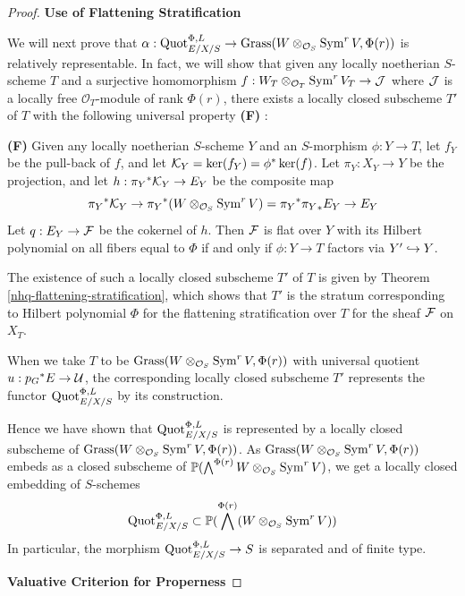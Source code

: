 \begin{proof}
\bigskip

\centerline{\large\bf Use of Flattening Stratification}
\nopagebreak
\medskip
\nopagebreak
We will next prove that
$\alpha :\operatorname{Quot}^{\Phi,L}_{E/X/S} \to
\operatorname{Grass}( W \otimes_{{\mathcal O}_S}\operatorname{Sym}^r V, \Phi(r))$
is relatively representable. In fact, we will show that
given any locally noetherian $S$-scheme $T$ and
a surjective homomorphism $f :  W_T \otimes_{{\mathcal O}_T}\operatorname{Sym}^r V_T \to \mathcal{J}$
where $\mathcal{J}$ is a locally free ${\mathcal O}_T$-module of rank $\Phi(r)$,
there exists a locally closed subscheme $T'$ of
$T$ with the following universal property \textbf{(F)} :

\textbf{(F) } Given any
locally noetherian $S$-scheme $Y$ and an $S$-morphism $\phi :Y\to T$,
let $f_Y$ be the pull-back of $f$, and
let $\mathcal{K}_Y = \operatorname{ker}(f_Y) = \phi^* \operatorname{ker}(f)$. Let
$\pi_Y : X_Y \to Y$ be the projection, and let
$h : {\pi_Y}^* \mathcal{K}_Y \to E_Y$ be the composite map
$${\pi_Y}^* \mathcal{K}_Y \to  {\pi_Y}^* (W \otimes_{{\mathcal O}_S}\operatorname{Sym}^r V)
= {\pi_Y}^*{\pi_Y}_*E_Y \to  E_Y$$
Let $q:   E_Y \to \mathcal{F}$ be the cokernel of $h$.
Then $\mathcal{F}$ is flat over $Y$ with its Hilbert polynomial on all fibers
equal to $\Phi$ if and only if $\phi :Y\to T$
factors via $Y'\hookrightarrow Y$.

The existence of such a locally closed subscheme $T'$ of
$T$ is given by Theorem \ref{nhq-flattening-stratification}, which
shows that $T'$ is the stratum corresponding to
Hilbert polynomial $\Phi$ for the
flattening stratification over $T$ for the sheaf $\mathcal{F}$ on $X_T$.

When we take $T$ to be $\operatorname{Grass}( W \otimes_{{\mathcal O}_S}\operatorname{Sym}^r V, \Phi(r))$
with universal quotient $u : {p_G}^*E \to \mathcal{U}$, the corresponding
locally closed subscheme $T'$ represents
the functor $\operatorname{Quot}^{\Phi,L}_{E/X/S}$ by its construction.

Hence we have shown that $\operatorname{Quot}^{\Phi,L}_{E/X/S}$ is represented
by a locally closed subscheme of
$\operatorname{Grass}( W \otimes_{{\mathcal O}_S}\operatorname{Sym}^r V, \Phi(r))$. As
$\operatorname{Grass}( W \otimes_{{\mathcal O}_S}\operatorname{Sym}^r V, \Phi(r))$ embeds as a
closed subscheme of $\mathbb{P}(\bigwedge ^{\Phi(r)} W \otimes_{{\mathcal O}_S}\operatorname{Sym}^r V)$,
we get a locally closed embedding of $S$-schemes
$$\operatorname{Quot}^{\Phi,L}_{E/X/S} \subset
\mathbb{P}(\bigwedge ^{\Phi(r)} (W \otimes_{{\mathcal O}_S}\operatorname{Sym}^r V))$$
In particular, the morphism $\operatorname{Quot}^{\Phi,L}_{E/X/S}\to S$
is separated and of finite type.



\bigskip


\centerline{\large\bf Valuative Criterion for Properness}



\end{proof}
